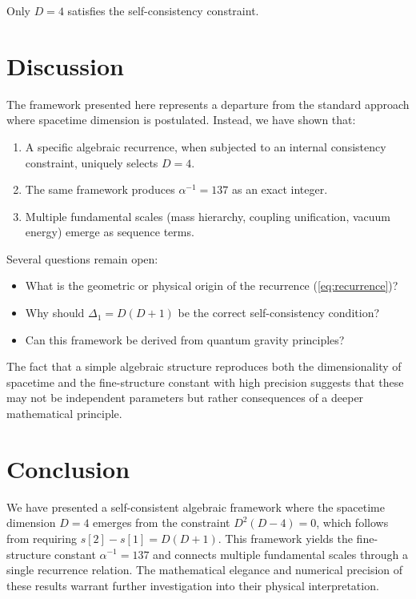 \documentclass[twocolumn,showpacs,preprintnumbers,amsmath,amssymb,prl]{revtex4-2}
\begin{document}
Only $D = 4$ satisfies the self-consistency constraint.

\section{Discussion}

The framework presented here represents a departure from the standard approach where spacetime dimension is postulated. Instead, we have shown that:

\begin{enumerate}
\item A specific algebraic recurrence, when subjected to an internal consistency constraint, uniquely selects $D = 4$.
\item The same framework produces $\alpha^{-1} = 137$ as an exact integer.
\item Multiple fundamental scales (mass hierarchy, coupling unification, vacuum energy) emerge as sequence terms.
\end{enumerate}

Several questions remain open:
\begin{itemize}
\item What is the geometric or physical origin of the recurrence (\ref{eq:recurrence})?
\item Why should $\Delta_1 = D(D+1)$ be the correct self-consistency condition?
\item Can this framework be derived from quantum gravity principles?
\end{itemize}

The fact that a simple algebraic structure reproduces both the dimensionality of spacetime and the fine-structure constant with high precision suggests that these may not be independent parameters but rather consequences of a deeper mathematical principle.

\section{Conclusion}

We have presented a self-consistent algebraic framework where the spacetime dimension $D = 4$ emerges from the constraint $D^2(D-4) = 0$, which follows from requiring $s[2] - s[1] = D(D+1)$. This framework yields the fine-structure constant $\alpha^{-1} = 137$ and connects multiple fundamental scales through a single recurrence relation. The mathematical elegance and numerical precision of these results warrant further investigation into their physical interpretation.
\end{document}

